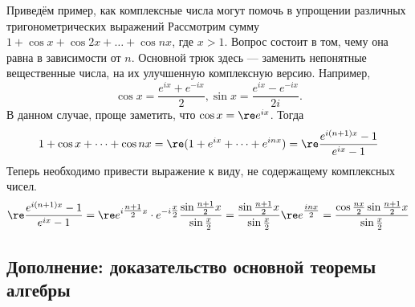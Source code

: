 Приведём пример, как комплексные числа могут помочь в упрощении различных тригонометрических выражений
Рассмотрим сумму $1+ \cos x + \cos 2x + \dots + \cos nx$, где $x > 1$. Вопрос состоит в том, чему она равна в зависимости от $n$. Основной трюк здесь --- заменить непонятные вещественные числа, на их улучшенную комплексную версию. Например, $$\cos x = \frac{e^{ix}+e^{-ix}}{2}, \sin x = \frac{e^{ix}-e^{-ix}}{2i}.$$
В данном случае, проще заметить, что $\cos x=\re e^{ix}$. Тогда
$$1 + \cos x+ \dots + \cos nx = \re(1+ e^{ix} + \dots + e^{inx}) = \re \frac{e^{i(n+1)x}-1}{e^{ix}-1}$$
Теперь необходимо привести выражение к виду, не содержащему комплексных чисел.
$$\re \frac{e^{i(n+1)x}-1}{e^{ix}-1} = \re e^{i\tfrac{n+1}{2}x}\cdot e^{-i\tfrac{x}{2}}\frac{\sin \tfrac{n+1}{2}x}{\sin\tfrac{x}{2}}=\frac{ \sin \tfrac{n+1}{2}x}{\sin\tfrac{x}{2}} \re e^{\tfrac{inx}{2}}=
\frac{\cos \tfrac{nx}{2} \sin \tfrac{n+1}{2}x}{\sin\tfrac{x}{2}}$$







\subsection*{Дополнение: доказательство основной теоремы алгебры}

